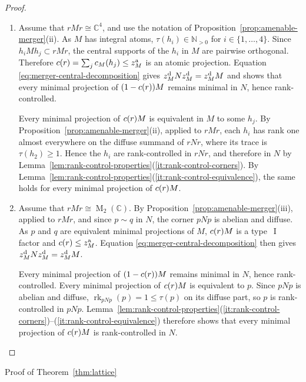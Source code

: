 \documentclass[11pt]{amsart}
\makeatletter
\numberwithin{equation}{section}
\def\subsection{\@startsection{subsection}{2}%
  \z@{.7\linespacing\@plus.7\linespacing}{.3\linespacing}%
  {\normalfont\bfseries}}
\newcommand{\nn}{\mathbb N}
\newcommand{\cc}{\mathbb C}
\DeclareMathOperator{\I}{I}
\DeclareMathOperator{\rk}{rk}
\newcommand{\rM}{\operatorname{M}}
\newcommand{\@optsub}[1]{\if\relax\detokenize{#1}\relax\else_{#1}\fi}
\newcommand{\csupp}[2][]{c\@optsub{#1}(#2)}
\newcommand{\zat}[1][]{z^{\mathrm{a}}\@optsub{#1}}
\newcommand{\zdiff}[1][]{z^{\mathrm{d}}\@optsub{#1}}
\theoremstyle{definition}
\makeatother
\begin{document}
\begin{proof}
\begin{enumerate}[\rm (i)]
    \item Assume that $rMr\cong\cc^4$, and use the notation of Proposition~\ref{prop:amenable-merger}\textup{(ii)}. As $M$ has integral atoms, $\tau(h_i)\in \nn_{>0}$ for $i\in \{1,\dots, 4\}$. Since $h_iMh_j\subset rMr$, the central supports of the $h_i$ in $M$ are pairwise orthogonal. Therefore $\csupp{r}=\sum_j\csupp[M]{h_j}\leq\zat[M]$ is an atomic projection. Equation \eqref{eq:merger-central-decomposition} gives $\zdiff[M]N\zdiff[M]=\zdiff[M]M$ and shows that every minimal projection of $(1-\csupp{r})M$ remains minimal in $N$, hence rank-controlled. 
    
    Every minimal projection of $\csupp{r}M$ is equivalent in $M$ to some $h_j$. By Proposition~\ref{prop:amenable-merger}\textup{(ii)}, applied to $rMr$, each $h_i$ has rank one almost everywhere on the diffuse summand of $rNr$, where its trace is $\tau(h_2)\geq1$. Hence the $h_i$ are rank-controlled in $rNr$, and therefore in $N$ by Lemma~\ref{lem:rank-control-properties}\textup{(\ref*{it:rank-control-corners})}. By Lemma~\ref{lem:rank-control-properties}\textup{(\ref*{it:rank-control-equivalence})}, the same holds for every minimal projection of $\csupp{r}M$.

    \item Assume that $rMr\cong\rM_2(\cc)$. By Proposition~\ref{prop:amenable-merger}\textup{(iii)}, applied to $rMr$, and since $p\sim q$ in $N$, the corner $pNp$ is abelian and diffuse.
    As $p$ and $q$ are equivalent minimal projections of $M$, $\csupp{r}M$ is a type~$\I$ factor and $\csupp{r}\leq\zat[M]$. Equation \eqref{eq:merger-central-decomposition} then gives
    $\zdiff[M]N\zdiff[M]=\zdiff[M]M$.

    Every minimal projection of $(1-\csupp{r})M$ remains minimal in $N$, hence rank-controlled. Every minimal projection of $\csupp{r}M$ is equivalent to $p$. Since $pNp$ is abelian and diffuse, $\rk_{pNp}(p)=1\leq\tau(p)$ on its diffuse part, so $p$ is rank-controlled in $pNp$. Lemma~\ref{lem:rank-control-properties}\textup{(\ref*{it:rank-control-corners})--(\ref*{it:rank-control-equivalence})} therefore shows that every minimal projection of $\csupp{r}M$ is rank-controlled in $N$.\qedhere
    \end{enumerate}
\end{proof}

\subsection{Proof of Theorem~\ref{thm:lattice}}
\label{subsec:lattice-proof}
\end{document}
